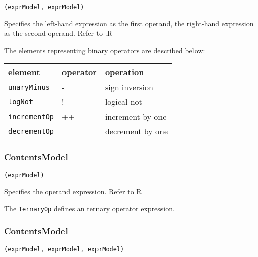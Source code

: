 \begin{lstlisting}[style=default,frame=none]
(exprModel, exprModel)
\end{lstlisting}


\begin{HIRChildElements}
	{Specifies the left-hand expression as the first operand, the right-hand 
	 expression as the second operand. Refer to .}{R}
\end{HIRChildElements}



The elements representing binary operators are described below: 

\begin{tabular}{|l|p{4cm}|l|}
	\hline
	 element & operator & operation \\ \hline\hline
	 {\tt unaryMinus} & - & sign inversion \\ \hline 
	 {\tt logNot} & ! & logical not \\ \hline 
	 {\tt incrementOp} & ++ & increment by one \\ \hline 
	 {\tt decrementOp} & -- & decrement by one \\ \hline 
\end{tabular}

\subsubsection*{ContentsModel}{}

\begin{lstlisting}[style=default,frame=none]
(exprModel)
\end{lstlisting}

\begin{HIRChildElements}
	{Specifies the operand expression. Refer to }{R}
\end{HIRChildElements}


The {\tt TernaryOp} defines an ternary operator expression.

\subsubsection*{ContentsModel}{}

\begin{lstlisting}[style=default,frame=none]
(exprModel, exprModel, exprModel)
\end{lstlisting}

